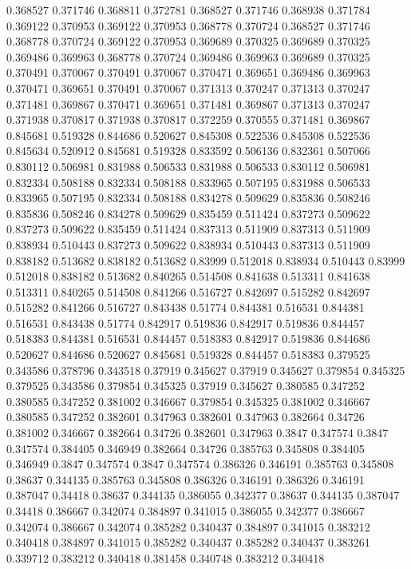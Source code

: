 0.368527 0.371746
0.368811 0.372781
0.368527 0.371746
0.368938 0.371784
0.369122 0.370953
0.369122 0.370953
0.368778 0.370724
0.368527 0.371746
0.368778 0.370724
0.369122 0.370953
0.369689 0.370325
0.369689 0.370325
0.369486 0.369963
0.368778 0.370724
0.369486 0.369963
0.369689 0.370325
0.370491 0.370067
0.370491 0.370067
0.370471 0.369651
0.369486 0.369963
0.370471 0.369651
0.370491 0.370067
0.371313 0.370247
0.371313 0.370247
0.371481 0.369867
0.370471 0.369651
0.371481 0.369867
0.371313 0.370247
0.371938 0.370817
0.371938 0.370817
0.372259 0.370555
0.371481 0.369867
0.845681 0.519328
0.844686 0.520627
0.845308 0.522536
0.845308 0.522536
0.845634 0.520912
0.845681 0.519328
0.833592 0.506136
0.832361 0.507066
0.830112 0.506981
0.831988 0.506533
0.831988 0.506533
0.830112 0.506981
0.832334 0.508188
0.832334 0.508188
0.833965 0.507195
0.831988 0.506533
0.833965 0.507195
0.832334 0.508188
0.834278 0.509629
0.835836 0.508246
0.835836 0.508246
0.834278 0.509629
0.835459 0.511424
0.837273 0.509622
0.837273 0.509622
0.835459 0.511424
0.837313 0.511909
0.837313 0.511909
0.838934 0.510443
0.837273 0.509622
0.838934 0.510443
0.837313 0.511909
0.838182 0.513682
0.838182 0.513682
0.83999 0.512018
0.838934 0.510443
0.83999 0.512018
0.838182 0.513682
0.840265 0.514508
0.841638 0.513311
0.841638 0.513311
0.840265 0.514508
0.841266 0.516727
0.842697 0.515282
0.842697 0.515282
0.841266 0.516727
0.843438 0.51774
0.844381 0.516531
0.844381 0.516531
0.843438 0.51774
0.842917 0.519836
0.842917 0.519836
0.844457 0.518383
0.844381 0.516531
0.844457 0.518383
0.842917 0.519836
0.844686 0.520627
0.844686 0.520627
0.845681 0.519328
0.844457 0.518383
0.379525 0.343586
0.378796 0.343518
0.37919 0.345627
0.37919 0.345627
0.379854 0.345325
0.379525 0.343586
0.379854 0.345325
0.37919 0.345627
0.380585 0.347252
0.380585 0.347252
0.381002 0.346667
0.379854 0.345325
0.381002 0.346667
0.380585 0.347252
0.382601 0.347963
0.382601 0.347963
0.382664 0.34726
0.381002 0.346667
0.382664 0.34726
0.382601 0.347963
0.3847 0.347574
0.3847 0.347574
0.384405 0.346949
0.382664 0.34726
0.385763 0.345808
0.384405 0.346949
0.3847 0.347574
0.3847 0.347574
0.386326 0.346191
0.385763 0.345808
0.38637 0.344135
0.385763 0.345808
0.386326 0.346191
0.386326 0.346191
0.387047 0.34418
0.38637 0.344135
0.386055 0.342377
0.38637 0.344135
0.387047 0.34418
0.386667 0.342074
0.384897 0.341015
0.386055 0.342377
0.386667 0.342074
0.386667 0.342074
0.385282 0.340437
0.384897 0.341015
0.383212 0.340418
0.384897 0.341015
0.385282 0.340437
0.385282 0.340437
0.383261 0.339712
0.383212 0.340418
0.381458 0.340748
0.383212 0.340418
